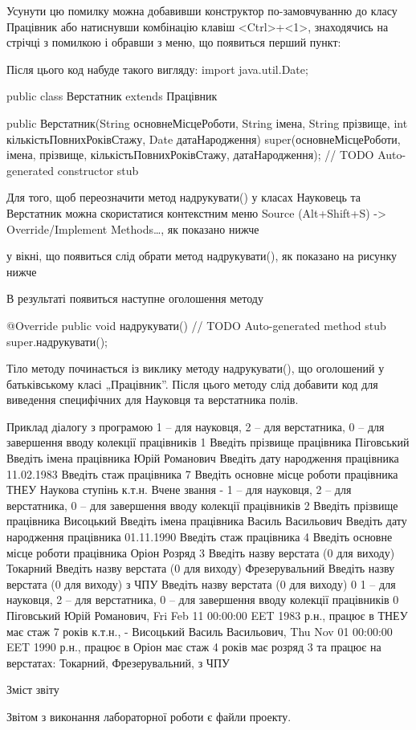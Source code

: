 Усунути цю помилку можна добавивши конструктор по-замовчуванню до класу Працівник або натиснувши комбінацію клавіш <Ctrl>+<1>, знаходячись на стрічці з помилкою і обравши з меню, що появиться перший пункт:
 

Після цього код набуде такого вигляду:
import java.util.Date;


public class Верстатник extends Працівник {

	public Верстатник(String основнеМісцеРоботи, String імена, String прізвище,
			int кількістьПовнихРоківСтажу, Date датаНародження) {
		super(основнеМісцеРоботи, імена, прізвище, кількістьПовнихРоківСтажу,
				датаНародження);
		// TODO Auto-generated constructor stub
	}

}

Для того, щоб переозначити метод надрукувати() у класах Науковець та Верстатник можна скористатися контекстним меню Source (Alt+Shift+S) -> Override/Implement Methods…, як показано нижче
 

у вікні, що появиться слід обрати метод надрукувати(), як показано на рисунку нижче

 

В результаті появиться наступне оголошення методу

	@Override
	public void надрукувати() {
		// TODO Auto-generated method stub
		super.надрукувати();
	}

Тіло методу починається із виклику методу надрукувати(), що оголошений у батьківському класі „Працівник”. Після цього методу слід добавити код для виведення специфічних для Науковця та верстатника полів.

Приклад діалогу з програмою 
1 – для науковця, 2 – для верстатника, 0 – для завершення вводу колекції працівників
1
Введіть прізвище працівника Піговський
Введіть імена працівника Юрій Романович
Введіть дату народження працівника 11.02.1983
Введіть стаж працівника 7
Введіть основне місце роботи працівника ТНЕУ
Наукова ступінь к.т.н.
Вчене звання -
1 – для науковця, 2 – для верстатника, 0 – для завершення вводу колекції працівників
2
Введіть прізвище працівника Висоцький
Введіть імена працівника Василь Васильович
Введіть дату народження працівника 01.11.1990
Введіть стаж працівника 4
Введіть основне місце роботи працівника Оріон
Розряд 3
Введіть назву верстата (0 для виходу) Токарний
Введіть назву верстата (0 для виходу) Фрезерувальний
Введіть назву верстата (0 для виходу) з ЧПУ
Введіть назву верстата (0 для виходу) 0
1 – для науковця, 2 – для верстатника, 0 – для завершення вводу колекції працівників
0
Піговський Юрій Романович, Fri Feb 11 00:00:00 EET 1983 р.н., працює в ТНЕУ має стаж 7 років
	к.т.н., -
Висоцький Василь Васильович, Thu Nov 01 00:00:00 EET 1990 р.н., працює в Оріон має стаж 4 років
	має розряд 3
	та працює на верстатах: Токарний, Фрезерувальний, з ЧПУ

Зміст звіту

Звітом з виконання лабораторної роботи є файли проекту.
 
